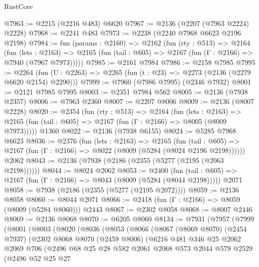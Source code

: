 \begin{lexlean}{RustCore}
\begin{coremodule}
@7963 := @2215 (@2216 @483) @6620
@7967 := @2136 (@2207 (@7963 @2224) @2228)
@7968 := @2241 @483
@7973 := @2238 (@2240 @7968 @6623 @2196 @2198)
@7984 := fun (params : @2160) =>
  @2162
    (fun (rty : @513) =>
    @2164
      (fun (lets : @2163) =>
      @2165 (fun (tail : @605) => @2167 (fun (Γ : @2166) => @7940 (@7967 @7973)))))
@7985 := @2161 @7984
@7986 := @2158 @7985
@7995 := @2264 (fun (U : @2263) => @2265 (fun (t : @23) => @2273 (@2136 (@2279 @6620 @2154) @2290)))
@7999 := @7960 (@7986 @7995) (@2346 @7932)
@8001 := @2121 @7985 @7995
@8003 := @2351 @7984 @562
@8005 := @2136 (@7938 @2357)
@8006 := @7963 @2360
@8007 := @2207 @8006
@8009 := @2136 (@8007 @2228)
@8020 := @2354
    (fun (rty : @513) =>
    @2164
      (fun (lets : @2163) =>
      @2165 (fun (tail : @605) => @2167 (fun (Γ : @2166) => @8005 (@8009 @7973)))))
    @1360
@8022 := @2136 (@7938 @6155)
@8024 := @5285 @7968 @6623
@8036 := @2376
    (fun (lets : @2163) =>
    @2165
      (fun (tail : @605) => @2167 (fun (Γ : @2166) => @8022 (@8009 (@5284 (@8024 @2196 @2198))))))
    @2062
@8043 := @2136 (@7938 (@2186 (@2355 (@5277 (@2195 (@2063 @2198))))))
@8044 := @8024 @2062
@8053 := @2400
    (fun (tail : @605) => @2167 (fun (Γ : @2166) => @8043 (@8009 (@5284 (@8044 @2198)))))
    @2071
@8058 := @7938 (@2186 (@2355 (@5277 (@2195 @2072))))
@8059 := @2136 @8058
@8060 := @8044 @2071
@8066 := @2418 (fun (Γ : @2166) => @8059 (@8009 (@5284 @8060))) @2443
@8067 := @2302 @8058
@8068 := @8007 @2446
@8069 := @2136 @8068
@8070 := @6205 @8060
@8134 := @7931
    (@7957
      (@7999
        (@8001
          (@8003
            (@8020
              (@8036
                (@8053
                  (@8066
                    (@8067
                      (@8069 @8070)
                      (@2454 @7937)
                      (@2302
                        @8068
                        @8070
                        (@2459 @8006)
                        (@6216
                          @481
                          @346
                          @25
                          @2062
                          @2069
                          @706
                          (@2496
                            @68
                            @25
                            @28
                            @582
                            @2061
                            @2068
                            @573
                            @2044
                            @579
                            @2529
                            (@2496
                              @52
                              @25
                              @27

\end{coremodule}
\end{lexlean}

